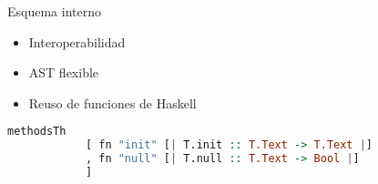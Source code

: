 \begin{frame}
  \framebreak{}
  \begin{center}
    Esquema interno
    \begin{itemize}
      \item Interoperabilidad

      \item AST flexible
      \item Reuso de funciones de Haskell
    \end{itemize}
  \end{center}
        \begin{lstlisting}[basicstyle=\small,language=haskell]
          methodsTh
            [ fn "init" [| T.init :: T.Text -> T.Text |]
            , fn "null" [| T.null :: T.Text -> Bool |]
            ]
        \end{lstlisting}
\end{frame}


